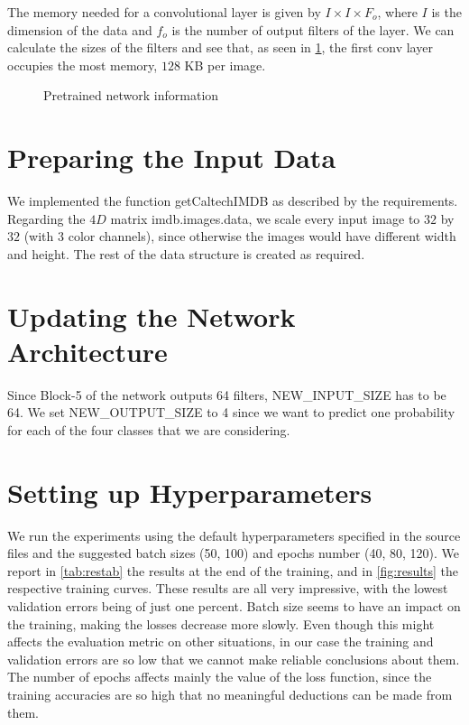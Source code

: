 \documentclass{article}
\begin{document}
The memory needed for a convolutional layer is given by $I \times I \times F_o$, where $I$ is the dimension of the data and $f_o$ is the number of output filters of the layer. We can calculate the sizes of the filters and see that, as seen in \cref{fig:memtable}, the first conv layer occupies the most memory, $128$ KB per image.


\begin{figure}[h]
    \centering
    \caption{Pretrained network information}
\label{fig:memtable}
\end{figure}

\section{Preparing the Input Data}

We implemented the function getCaltechIMDB as described by the requirements. Regarding the $4D$ matrix imdb.images.data, we scale every input image to $32$ by $32$ (with 3 color channels), since otherwise the images would have different width and height. The rest of the data structure is created as required.

\section{Updating the Network Architecture}

Since Block-5 of the network outputs 64 filters, NEW\_INPUT\_SIZE has to be 64.
We set NEW\_OUTPUT\_SIZE to 4 since we want to predict one probability for each of the four classes that we are considering. %

\section{Setting up Hyperparameters}

We run the experiments using the default hyperparameters specified in the source files and the suggested batch sizes (50, 100) and epochs number (40, 80, 120). We report in \cref{tab:restab} the results at the end of the training, and in \cref{fig:results} the respective training curves. These results are all very impressive, with the lowest validation errors being of just one percent. Batch size seems to have an impact on the training, making the losses decrease more slowly. Even though this might affects the evaluation metric on other situations, in our case the training and validation errors are so low that we cannot make reliable conclusions about them. The number of epochs affects mainly the value of the loss function, since the training accuracies are so high that no meaningful deductions can be made from them.
\end{document}
